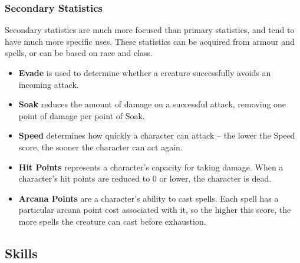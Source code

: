 \subsubsection{Secondary Statistics}

Secondary statistics are much more focused than primary statistics, and
tend to have much more specific uses.  These statistics can be acquired
from armour and spells, or can be based on race and class.

\begin{itemize}
\item {\bf Evade} is used to determine whether a creature successfully
avoids an incoming attack.

\item {\bf Soak} reduces the amount of damage on a successful attack,
removing one point of damage per point of Soak.

\item {\bf Speed} determines how quickly a character can attack -- the
lower the Speed score, the sooner the character can act again.

\item {\bf Hit Points} represents a character's capacity for taking damage.
When a character's hit points are reduced to 0 or lower, the character is
dead.

\item {\bf Arcana Points} are a character's ability to cast spells.  Each
spell has a particular arcana point cost associated with it, so the higher
this score, the more spells the creature can cast before exhaustion.
\end{itemize}

\subsection{Skills}

